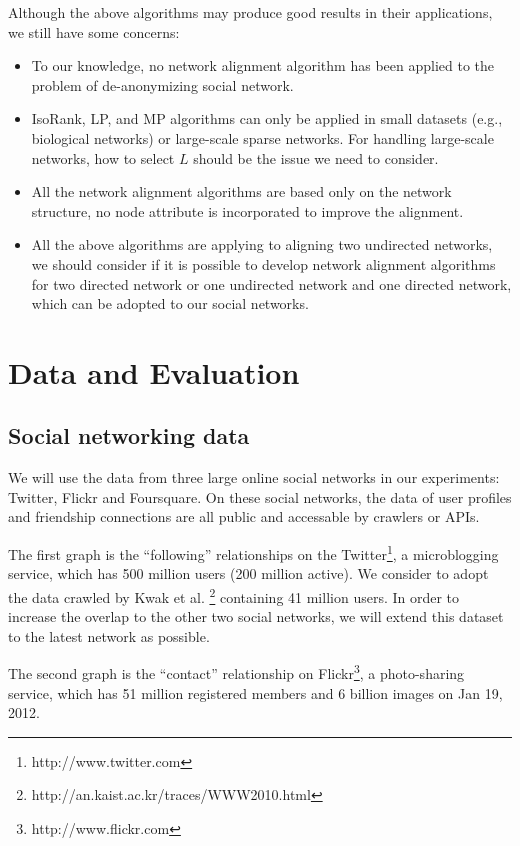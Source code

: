 \documentclass[11pt,letterpaper]{article}
\begin{document}
Although the above algorithms may produce good results in their applications, we still have some concerns:
\begin{itemize}
   \item
      To our knowledge, no network alignment algorithm has been applied to the problem of de-anonymizing social network.
   \item
      IsoRank, LP, and MP algorithms can only be applied in small datasets (e.g., biological networks) or large-scale sparse networks. For handling large-scale networks, how to select $L$ should be the issue we need to consider. 
   \item
      All the network alignment algorithms are based only on the network structure, no node attribute is incorporated to improve the alignment. 
   \item
      All the above algorithms are applying to aligning two undirected networks, we should consider if it is possible to develop network alignment algorithms for two directed network or one undirected network and one directed network, which can be adopted to our social networks. 
\end{itemize}

\section{Data and Evaluation}

\subsection{Social networking data}
We will use the data from three large online social networks in our experiments: Twitter, Flickr and Foursquare. On these social networks, the data of user profiles and friendship connections are all public and accessable by crawlers or APIs. 

The first graph is the ``following'' relationships on the Twitter\footnote{http://www.twitter.com}, a microblogging service, which has 500 million users (200 million active). We consider to adopt the data crawled by  Kwak et al. \footnote{http://an.kaist.ac.kr/traces/WWW2010.html} containing 41 million users. In order to increase the overlap to the other two social networks, we will extend this dataset to the latest network as possible. 

The second graph is the ``contact'' relationship on Flickr\footnote{http://www.flickr.com}, a photo-sharing service, which has 51 million registered members and 6 billion images on Jan 19, 2012.
\end{document}

